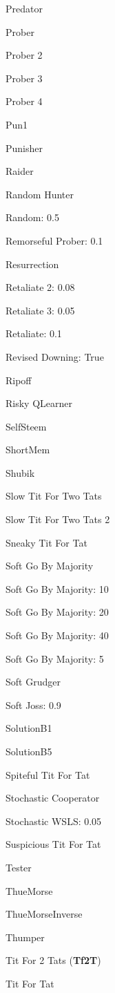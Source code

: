 \item Predator
\item Prober
\item Prober 2
\item Prober 3
\item Prober 4
\item Pun1
\item Punisher
\item Raider
\item Random Hunter
\item Random: 0.5
\item Remorseful Prober: 0.1
\item Resurrection
\item Retaliate 2: 0.08
\item Retaliate 3: 0.05
\item Retaliate: 0.1
\item Revised Downing: True
\item Ripoff
\item Risky QLearner
\item SelfSteem
\item ShortMem
\item Shubik
\item Slow Tit For Two Tats
\item Slow Tit For Two Tats 2
\item Sneaky Tit For Tat
\item Soft Go By Majority
\item Soft Go By Majority: 10
\item Soft Go By Majority: 20
\item Soft Go By Majority: 40
\item Soft Go By Majority: 5
\item Soft Grudger
\item Soft Joss: 0.9
\item SolutionB1
\item SolutionB5
\item Spiteful Tit For Tat
\item Stochastic Cooperator
\item Stochastic WSLS: 0.05
\item Suspicious Tit For Tat
\item Tester
\item ThueMorse
\item ThueMorseInverse
\item Thumper
\item Tit For 2 Tats
(\textbf{Tf2T})\item Tit For Tat
